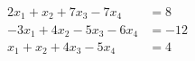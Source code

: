 \begin{align*}
2x_1  + x_2 + 7x_3 - 7x_4 &= 8 \\
-3x_1 + 4x_2 -5x_3 - 6x_4 &=  -12 \\
x_1 +x_2 + 4x_3 - 5x_4 &=  4  
\end{align*}